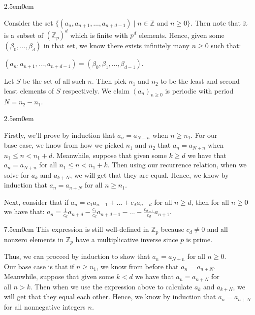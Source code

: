 \documentclass{book}
\newcommand{\exOne}{%
   \color{Purple}%
   \fontsize{13}{15}\selectfont%
}
\newcommand{\exTwoP}{%
   \color{RedViolet}%
   \fontsize{13}{15}\selectfont%
}
\newcommand{\exPP}{%
   \color{RedViolet}%
   \fontsize{12}{14}\selectfont%
}
\newenvironment{myIndent}{%
   \begin{adjustwidth}{2.5em}{0em}%
}{%
   \end{adjustwidth}%
}
\newenvironment{myTindent}{%
   \begin{adjustwidth}{7.5em}{0em}%
}{%
   \end{adjustwidth}%
}
\newcommand{\retTwo}{\hfill\bigbreak}
\begin{document}
\begin{myIndent}\exOne
   Consider the set $\{(a_n, a_{n+1},\ldots, a_{n+d-1}) \mid n \in \mathbb{Z} \text{ and } n \geq 0\}$. Then note that it is a subset of $(\mathbb{Z}_p)^d$ which is finite with $p^d$ elements. Hence, given some $(\beta_0, \ldots, \beta_d)$ in that set, we know there exists infinitely many $n \geq 0$ such that:

   {\centering$(a_n, a_{n+1},\ldots, a_{n+d-1}) = (\beta_0, \beta_1, \ldots, \beta_{d-1})$.\retTwo\par} 
   
   Let $S$ be the set of all such $n$. Then pick $n_1$ and $n_2$ to be the least and second least elements of $S$ respectively. We claim $(a_n)_{n \geq 0}$ is periodic with period $N = n_2 - n_1$.\retTwo

   \begin{myIndent}\exTwoP
      Firstly, we'll prove by induction that $a_n = a_{N + n}$ when $n \geq n_1$. For our\\ base case, we know from how we picked $n_1$ and $n_2$ that $a_n = a_{N + n}$ when\\ $n_1 \leq n < n_1 + d$. Meanwhile, suppose that given some $k \geq d$ we have that\\ $a_n = a_{N + n}$ for all $n_1 \leq n < n_1 + k$. Then using our recurrence relation, when we solve for $a_k$ and $a_{k + N}$, we will get that they are equal. Hence, we know by induction that $a_n = a_{n + N}$ for all $n \geq n_1$.\retTwo

      Next, consider that if $a_n = c_1a_{n-1} + \ldots + c_d a_{n-d}$ for all $n \geq d$, then for all $n \geq 0$ we have that: $a_n = \frac{1}{c_d}a_{n + d} - \frac{c_1}{c_d}a_{n + d - 1} - \ldots - \frac{c_{d-1}}{c_d}a_{n + 1}$.
      
      \begin{myTindent}\exPP\color{VioletRed}
         This expression is still well-defined in $\mathbb{Z}_p$ because $c_d \neq 0$ and all nonzero elements in $\mathbb{Z}_p$ have a multiplicative inverse since $p$ is prime.\retTwo
      \end{myTindent}

      Thus, we can proceed by induction to show that $a_n = a_{N + n}$ for all $n \geq 0$.\\ Our base case is that if $n \geq n_1$, we know from before that $a_n = a_{n + N}$.\\ Meanwhile, suppose that given some $k < d$ we have that $a_n = a_{n + N}$ for\\ all $n > k$. Then when we use the expression above to calculate $a_k$ and $a_{k + N}$, we will get that they equal each other. Hence, we know by induction that $a_n = a_{n + N}$ for all nonnegative integers $n$.\retTwo
   \end{myIndent}
\end{myIndent}
\end{document}
